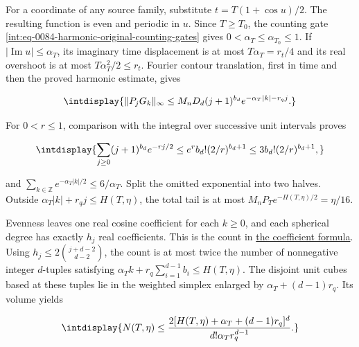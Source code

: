 
For a coordinate of any source family, substitute \(t=T(1+\cos u)/2\). The resulting function is even and periodic in \(u\). Since \(T\ge T_0\), the counting gate \eqref{int:eq-0084-harmonic-original-counting-gates} gives \(0<\alpha_T\le\alpha_{T_0}\le1\). If \(|\operatorname{Im}u|\le\alpha_T\), its imaginary time displacement is at most \(T\alpha_T=r_t/4\) and its real overshoot is at most \(T\alpha_T^2/2\le r_t\). Fourier contour translation, first in time and then the proved harmonic estimate, gives


\begingroup\renewcommand{\theHequation}{intdisplay.559}
\begin{equation*}
\intdisplay{
\|P_jG_k\|_\infty\le
 M_nD_d(j+1)^{b_d}e^{-\alpha_T|k|-r_qj}.
}
\end{equation*}
\endgroup


For \(0<r\le1\), comparison with the integral over successive unit intervals proves


\begingroup\renewcommand{\theHequation}{intdisplay.560}
\begin{equation*}
\intdisplay{
\sum_{j\ge0}(j+1)^{b_d}e^{-rj/2}
 \le e^r b_d!(2/r)^{b_d+1}\le3b_d!(2/r)^{b_d+1},
}
\end{equation*}
\endgroup


and \(\sum_{k\in\mathbb Z}e^{-\alpha_T|k|/2}\le6/\alpha_T\). Split the omitted exponential into two halves. Outside \(\alpha_T|k|+r_qj\le H(T,\allowbreak \eta)\), the total tail is at most \(M_nP_Te^{-H(T,\allowbreak \eta)/2}=\eta/16\).



Evenness leaves one real cosine coefficient for each \(k\ge0\), and each spherical degree has exactly \(h_j\) real coefficients. This is the count in \hyperref[int:harmonic-variable-budget-theorem]{the coefficient formula}. Using \(h_j\le2\binom{j+d-2}{d-2}\), the count is at most twice the number of nonnegative integer \(d\)-tuples satisfying \(\alpha_Tk+r_q\sum_{i=1}^{d-1}b_i\le H(T,\allowbreak \eta)\). The disjoint unit cubes based at these tuples lie in the weighted simplex enlarged by \(\alpha_T+(d-1)r_q\). Its volume yields


\begingroup\renewcommand{\theHequation}{intdisplay.561}
\begin{equation}
\intdisplay{
N(T,\eta)\le
 \frac{2[H(T,\eta)+\alpha_T+(d-1)r_q]^d}
       {d!\alpha_T r_q^{d-1}}.
}
\label{int:eq-0233-harmonic-simplex-count}
\end{equation}
\endgroup

